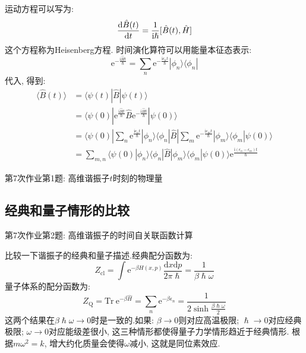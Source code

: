          运动方程可以写为:  
        \begin{equation}
            \frac{\mathrm{d}{\hat{B}(t)}}{\mathrm{d}{t}} = \frac{1}{\mathrm{i} \hslash}[\hat{B}(t), \hat{H}]
        \end{equation}
        这个方程称为Heisenberg方程. 
        时间演化算符可以用能量本征态表示:
        \[ \mathrm{e}^{-\frac {\mathrm{i}\hat{H}t}{\hslash}} = \sum_n \mathrm{e}^{-\frac {\mathrm{i}\epsilon_n t}{\hslash}} |\phi_n \rangle \langle\phi_n| \]
        代入, 得到:
        \begin{equation}\begin{aligned}
            \langle \hat{B}(t) \rangle &= \langle \psi(t)|\hat{B} | \psi(t) \rangle\\
            &= \langle \psi(0) |\mathrm{e}^{\frac {\mathrm{i}\hat{H}t}{\hslash}} \hat{B} \mathrm{e}^{-\frac {\mathrm{i}\hat{H}t}{\hslash}}|\psi(0) \rangle\\
            &= \langle \psi(0) |\sum_n \mathrm{e}^{\frac {\mathrm{i}\epsilon_n t}{\hslash}} |\phi_n \rangle \langle\phi_n|\hat{B}|\sum_m \mathrm{e}^{-\frac {\mathrm{i}\epsilon_m t}{\hslash}} |\phi_m \rangle \langle\phi_m|\psi(0)\rangle\\
            &= \sum_{m,n} \langle \psi(0)|\phi_n\rangle \langle \phi_n|\hat{B}|\phi_m \rangle \langle \phi_m|\psi(0)\rangle \mathrm{e}^{\frac {\mathrm{i}(\epsilon_n-\epsilon_m)t}{\hslash}}
        \end{aligned}\end{equation}
        \begin{asg}
            第7次作业第1题: 高维谐振子$t$时刻的物理量
        \end{asg}

    \subsection{经典和量子情形的比较}
    
    \begin{asg}
        第7次作业第2题: 高维谐振子的时间自关联函数计算
    \end{asg}

    比较一下谐振子的经典和量子描述.经典配分函数为:
    \[ Z_\mathrm{cl} = \int \mathrm{e}^{-\beta H(x,p)}\frac {\mathrm{d}x\mathrm{d}p}{2\pi\hslash} = \frac 1{\beta\hslash\omega} \]
    量子体系的配分函数为:
    \[ Z_\mathrm{Q} = \mathrm{Tr} \ \mathrm{e}^{-\beta \hat{H}} = \sum_n \mathrm{e}^{-\beta\epsilon_n} = \frac 1{2\sinh{\frac {\beta\hslash\omega}2}} \]
    这两个结果在$\beta\hslash\omega \to 0$时是一致的.如果:
    $\beta \to 0$则对应高温极限; $\hslash \to 0$对应经典极限; 
    $\omega \to 0$对应能级差很小, 这三种情形都使得量子力学情形趋近于经典情形.
    根据$m\omega^2 = k$, 增大约化质量会使得$\omega$减小, 这就是同位素效应.

